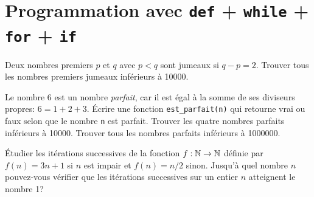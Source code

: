 \section{Programmation avec \texttt{def} + \texttt{while} +
\texttt{for} + \texttt{if}}

\begin{question}
Deux nombres premiers $p$ et $q$ avec $p<q$ sont jumeaux si $q-p=2$. Trouver
tous les nombres premiers jumeaux inférieurs à 10000.
\end{question}

\begin{question}
Le nombre 6 est un nombre \emph{parfait}, car il est égal à la somme de ses
diviseurs propres: $6=1+2+3$. Écrire une fonction \texttt{est\_parfait(n)} qui
retourne vrai ou faux selon que le nombre \texttt{n} est parfait.
Trouver les quatre nombres parfaits inférieurs à 10000. Trouver tous les nombres
parfaits inférieurs à 1000000.
\end{question}




\begin{question}
Étudier les itérations successives de la fonction $f : \mathbb{N} \rightarrow \mathbb{N}$ définie par
$f(n) = 3n+1$ si $n$ est impair
et $f(n) = n/2$ sinon.
Jusqu'à quel nombre $n$ pouvez-vous vérifier que les itérations successives
sur un entier $n$ atteignent le nombre 1?
\end{question}



